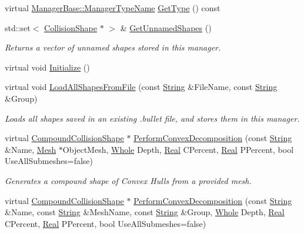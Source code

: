 \begin{DoxyCompactItemize}
virtual \hyperlink{classMezzanine_1_1ManagerBase_a08cecf5169cad3e82be81a3a159b0b6e}{ManagerBase::ManagerTypeName} \hyperlink{classMezzanine_1_1CollisionShapeManager_a4b98446e667a402e675eec79353e5278}{GetType} () const 
\item 
std::set$<$ \hyperlink{classMezzanine_1_1CollisionShape}{CollisionShape} $\ast$ $>$ \& \hyperlink{classMezzanine_1_1CollisionShapeManager_aebc9b1d42e5c4bc0d69afb3fca7ace1e}{GetUnnamedShapes} ()
\begin{DoxyCompactList}\small\item\em Returns a vector of unnamed shapes stored in this manager. \item\end{DoxyCompactList}\item 
virtual void \hyperlink{classMezzanine_1_1CollisionShapeManager_a15ddc7bb06cf1cf32cd4e641d3b7b34f}{Initialize} ()
\item 
virtual void \hyperlink{classMezzanine_1_1CollisionShapeManager_af76b90ccca8183a6ddfc33b7a4e65773}{LoadAllShapesFromFile} (const \hyperlink{namespaceMezzanine_acf9fcc130e6ebf08e3d8491aebcf1c86}{String} \&FileName, const \hyperlink{namespaceMezzanine_acf9fcc130e6ebf08e3d8491aebcf1c86}{String} \&Group)
\begin{DoxyCompactList}\small\item\em Loads all shapes saved in an existing .bullet file, and stores them in this manager. \item\end{DoxyCompactList}\item 
virtual \hyperlink{classMezzanine_1_1CompoundCollisionShape}{CompoundCollisionShape} $\ast$ \hyperlink{classMezzanine_1_1CollisionShapeManager_ab9a17c8322a36a7d1c8ee80ff11e1662}{PerformConvexDecomposition} (const \hyperlink{namespaceMezzanine_acf9fcc130e6ebf08e3d8491aebcf1c86}{String} \&Name, \hyperlink{classMezzanine_1_1Mesh}{Mesh} $\ast$ObjectMesh, \hyperlink{namespaceMezzanine_adcbb6ce6d1eb4379d109e51171e2e493}{Whole} Depth, \hyperlink{namespaceMezzanine_a726731b1a7df72bf3583e4a97282c6f6}{Real} CPercent, \hyperlink{namespaceMezzanine_a726731b1a7df72bf3583e4a97282c6f6}{Real} PPercent, bool UseAllSubmeshes=false)
\begin{DoxyCompactList}\small\item\em Generates a compound shape of Convex Hulls from a provided mesh. \item\end{DoxyCompactList}\item 
virtual \hyperlink{classMezzanine_1_1CompoundCollisionShape}{CompoundCollisionShape} $\ast$ \hyperlink{classMezzanine_1_1CollisionShapeManager_a639aa9c6c09f859dea4a200feb50528b}{PerformConvexDecomposition} (const \hyperlink{namespaceMezzanine_acf9fcc130e6ebf08e3d8491aebcf1c86}{String} \&Name, const \hyperlink{namespaceMezzanine_acf9fcc130e6ebf08e3d8491aebcf1c86}{String} \&MeshName, const \hyperlink{namespaceMezzanine_acf9fcc130e6ebf08e3d8491aebcf1c86}{String} \&Group, \hyperlink{namespaceMezzanine_adcbb6ce6d1eb4379d109e51171e2e493}{Whole} Depth, \hyperlink{namespaceMezzanine_a726731b1a7df72bf3583e4a97282c6f6}{Real} CPercent, \hyperlink{namespaceMezzanine_a726731b1a7df72bf3583e4a97282c6f6}{Real} PPercent, bool UseAllSubmeshes=false)

\end{DoxyCompactItemize}
